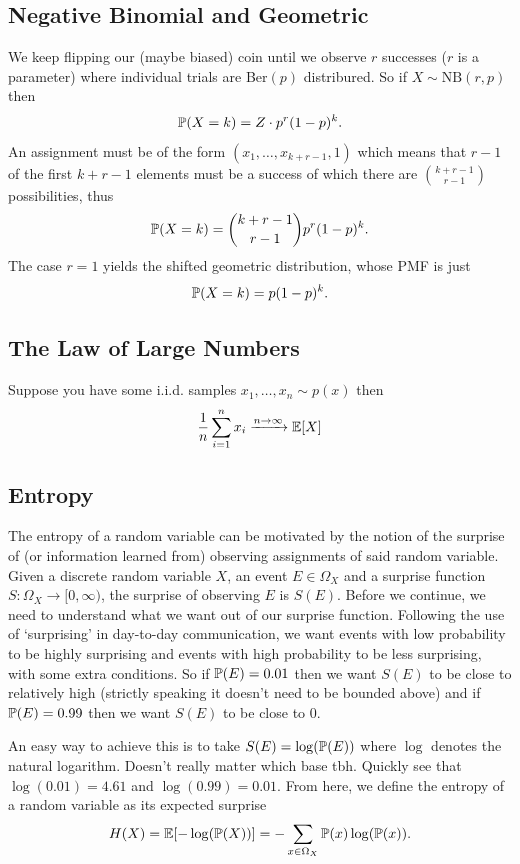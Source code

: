 \documentclass[11pt]{article}
\begin{document}
\begin{appendices}
\subsection{Negative Binomial and Geometric}
We keep flipping our (maybe biased) coin until we observe $r$ successes ($r$ is a parameter) where individual trials are Ber$(p)$ distribured. So if $X\sim\text{NB}(r,p)$ then
$$
\P(X=k)
=
Z\cdot p^r(1-p)^k.
$$
An assignment must be of the form $(x_1,\dots,x_{k+r-1},1)$ which means that $r-1$ of the first $k+r-1$ elements must be a success of which there are $\binom{k+r-1}{r-1}$ possibilities, thus
$$
\P(X=k)
=
\binom{k+r-1}{r-1}p^r(1-p)^k.
$$
The case $r=1$ yields the shifted geometric distribution, whose PMF is just
$$
\P(X=k)
=
p(1-p)^k.
$$

\subsection{The Law of Large Numbers}
Suppose you have some i.i.d. samples $x_1,\dots,x_n\sim p(x)$ then
$$
\frac{1}{n}\sum_{i=1}^n x_i
\xrightarrow{n\to\infty}
\E[X]
$$

\subsection{Entropy}
\label{app:entropy}

The entropy of a random variable can be motivated by the notion of the surprise of (or information learned from) observing assignments of said random variable. Given a discrete random variable $X$, an event $E\in\Omega_X$ and a surprise function $S:\Omega_X\rightarrow[0,\infty)$, the surprise of observing $E$ is $S(E)$. Before we continue, we need to understand what we want out of our surprise function. Following the use of `surprising' in day-to-day communication, we want events with low probability to be highly surprising and events with high probability to be less surprising, with some extra conditions. So if $\P(E)=0.01$ then we want $S(E)$ to be close to relatively high (strictly speaking it doesn't need to be bounded above) and if $\P(E)=0.99$ then we want $S(E)$ to be close to 0.

An easy way to achieve this is to take $S(E)=\log(\P(E))$ where $\log$ denotes the natural logarithm. Doesn't really matter which base tbh. Quickly see that $\log(0.01)=4.61$ and $\log(0.99)=0.01$. From here, we define the entropy of a random variable as its expected surprise
$$
H(X)
=
\E[-\log(\P(X))]
=
-\sum_{x\in \Omega_X}\P(x)\log(\P(x)).
$$


\end{appendices}
\end{document}
